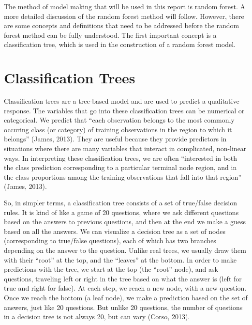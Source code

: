 \documentclass[12pt,twoside]{reedthesis}
\begin{document}
  The method of model making that will be used in this report is random
  forest. A more detailed discussion of the random forest method will
  follow. However, there are some concepts and definitions that need to be
  addressed before the random forest method can be fully understood. The
  first important concept is a classification tree, which is used in the
  construction of a random forest model.
  
  \section{Classification Trees}\label{classification-trees}
  
  Classification trees are a tree-based model and are used to predict a
  qualitative response. The variables that go into these classification
  trees can be numerical or categorical. We predict that ``each
  observation belongs to the most commonly occuring class (or category) of
  training observations in the region to which it belongs'' (James, 2013).
  They are useful because they provide predictors in situations where
  there are many variables that interact in complicated, non-linear ways.
  In interpreting these classification trees, we are often ``interested in
  both the class prediction corresponding to a particular terminal node
  region, and in the class proportions among the training observations
  that fall into that region'' (James, 2013).
  
  So, in simpler terms, a classification tree consists of a set of
  true/false decision rules. It is kind of like a game of 20 questions,
  where we ask different questions based on the answers to previous
  questions, and then at the end we make a guess based on all the answers.
  We can visualize a decision tree as a set of nodes (corresponding to
  true/false questions), each of which has two branches depending on the
  answer to the question. Unlike real trees, we usually draw them with
  their ``root'' at the top, and the ``leaves'' at the bottom. In order to
  make predictions with the tree, we start at the top (the ``root'' node),
  and ask questions, traveling left or right in the tree based on what the
  answer is (left for true and right for false). At each step, we reach a
  new node, with a new question. Once we reach the bottom (a leaf node),
  we make a prediction based on the set of answers, just like 20
  questions. But unlike 20 questions, the number of questions in a
  decision tree is not always 20, but can vary (Corso, 2013).
  
\end{document}
